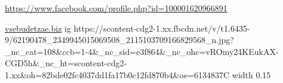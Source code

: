  
 
 
 
 

\url{https://www.facebook.com/profile.php?id=100001620966891}\par
\url{vsebudetzae.biz}
\ifcmt
  ig https://scontent-cdg2-1.xx.fbcdn.net/v/t1.6435-9/62190478_2349945015069508_2115103709166829568_n.jpg?_nc_cat=108&ccb=1-4&_nc_sid=e3f864&_nc_ohc=vROmy24KEukAX-CGD5h&_nc_ht=scontent-cdg2-1.xx&oh=82bde02fc4037dd1fa17b0c12fd870b4&oe=6134837C
  width 0.15
\fi
